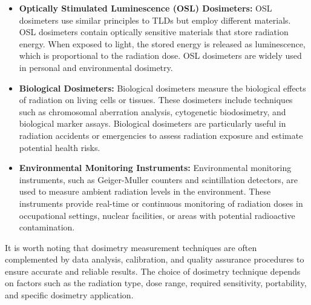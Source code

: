 \documentclass[../introduction.tex]{subfiles}
\begin{document}
\begin{itemize}
            \item \textbf{Optically Stimulated Luminescence (OSL) Dosimeters: } OSL dosimeters use similar principles to 
            TLDs but employ different materials. OSL dosimeters contain optically sensitive materials that store radiation 
            energy. When exposed to light, the stored energy is released as luminescence, which is proportional to the 
            radiation dose. OSL dosimeters are widely used in personal and environmental dosimetry.

            \item \textbf{Biological Dosimeters: } Biological dosimeters measure the biological effects of radiation on 
            living cells or tissues. These dosimeters include techniques such as chromosomal aberration analysis, 
            cytogenetic biodosimetry, and biological marker assays. Biological dosimeters are particularly useful in 
            radiation accidents or emergencies to assess radiation exposure and estimate potential health risks.

            \item \textbf{Environmental Monitoring Instruments: } Environmental monitoring instruments, such as 
            Geiger-Muller counters and scintillation detectors, are used to measure ambient radiation levels in the 
            environment. These instruments provide real-time or continuous monitoring of radiation doses in occupational 
            settings, nuclear facilities, or areas with potential radioactive contamination.

        \end{itemize}
        It is worth noting that dosimetry measurement techniques are often complemented by data analysis, calibration, 
        and quality assurance procedures to ensure accurate and reliable results. The choice of dosimetry technique depends 
        on factors such as the radiation type, dose range, required sensitivity, portability, and specific dosimetry 
        application.
\end{document}
